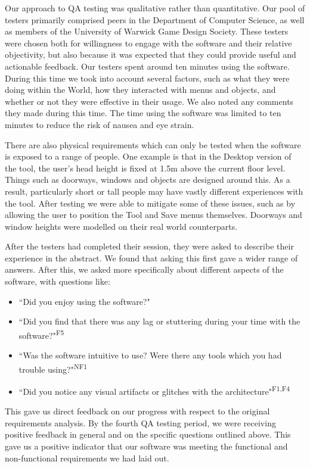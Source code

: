 Our approach to QA testing was qualitative rather than quantitative. Our pool of testers primarily comprised peers in the Department of Computer Science, as well as members of the University of Warwick Game Design Society. These testers were chosen both for willingness to engage with the software and their relative objectivity, but also because it was expected that they could provide useful and actionable feedback. Our testers spent around ten minutes using the software. During this time we took into account several factors, such as what they were doing within the World, how they interacted with menus and objects, and whether or not they were effective in their usage. We also noted any comments they made during this time. The time using the software was limited to ten minutes to reduce the risk of nausea and eye strain.

There are also physical requirements which can only be tested when the software is exposed to a range of people. One example is that in the Desktop version of the tool, the user's head height is fixed at 1.5m above the current floor level. Things such as doorways, windows and objects are designed around this. As a result, particularly short or tall people may have vastly different experiences with the tool. After testing we were able to mitigate some of these issues, such as by allowing the user to position the Tool and Save menus themselves. Doorways and window heights were modelled on their real world counterparts.

After the testers had completed their session, they were asked to describe their experience in the abstract. We found that asking this first gave a wider range of answers. After this, we asked more specifically about different aspects of the software, with questions like:

\begin{itemize}
    \item ``Did you enjoy using the software?"
    \item ``Did you find that there was any lag or stuttering during your time with the software?"\textsuperscript{F5}
    \item ``Was the software intuitive to use? Were there any tools which you had trouble using?"\textsuperscript{NF1}
    \item ``Did you notice any visual artifacts or glitches with the architecture"\textsuperscript{F1,F4}
\end{itemize}

This gave us direct feedback on our progress with respect to the original requirements analysis. By the fourth QA testing period, we were receiving positive feedback in general and on the specific questions outlined above. This gave us a positive indicator that our software was meeting the functional and non-functional requirements we had laid out.

